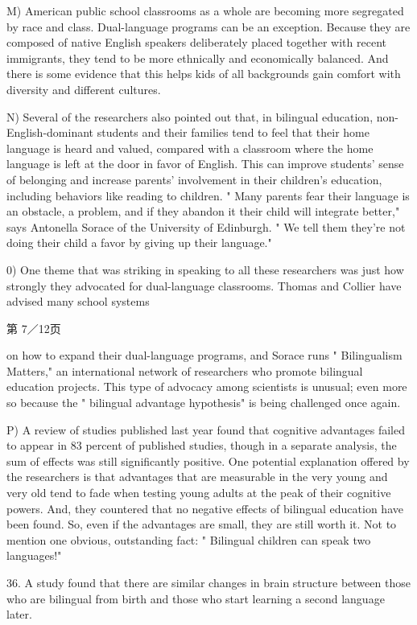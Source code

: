 \documentclass[UTF8,11pt]{ctexart}
\begin{document}
M) American public school classrooms as a whole are becoming more segregated by race and class. Dual-language programs can be an exception. Because they are composed of native English speakers deliberately placed together with recent immigrants, they tend to be more ethnically and economically balanced. And there is some evidence that this helps kids of all backgrounds gain comfort with diversity and different cultures.


N) Several of the researchers also pointed out that, in bilingual education, non-English-dominant students and their families tend to feel that their home language is heard and valued, compared with a classroom where the home language is left at the door in favor of English. This can improve students' sense of belonging and increase parents' involvement in their children's education, including behaviors like reading to children. " Many parents fear their language is an obstacle, a problem, and if they abandon it their child will integrate better," says Antonella Sorace of the University of Edinburgh. " We tell them they're not doing their child a favor by giving up their language."


0) One theme that was striking in speaking to all these researchers was just how strongly they advocated for dual-language classrooms. Thomas and Collier have advised many school systems


第 7／12页


on how to expand their dual-language programs, and Sorace runs " Bilingualism Matters," an international network of researchers who promote bilingual education projects. This type of advocacy among scientists is unusual; even more so because the " bilingual advantage hypothesis" is being challenged once again.


P) A review of studies published last year found that cognitive advantages failed to appear in 83 percent of published studies, though in a separate analysis, the sum of effects was still significantly positive. One potential explanation offered by the researchers is that advantages that are measurable in the very young and very old tend to fade when testing young adults at the peak of their cognitive powers. And, they countered that no negative effects of bilingual education have been found. So, even if the advantages are small, they are still worth it. Not to mention one obvious, outstanding fact: " Bilingual children can speak two languages!"


36. A study found that there are similar changes in brain structure between those who are bilingual from birth and those who start learning a second language later.
\end{document}
